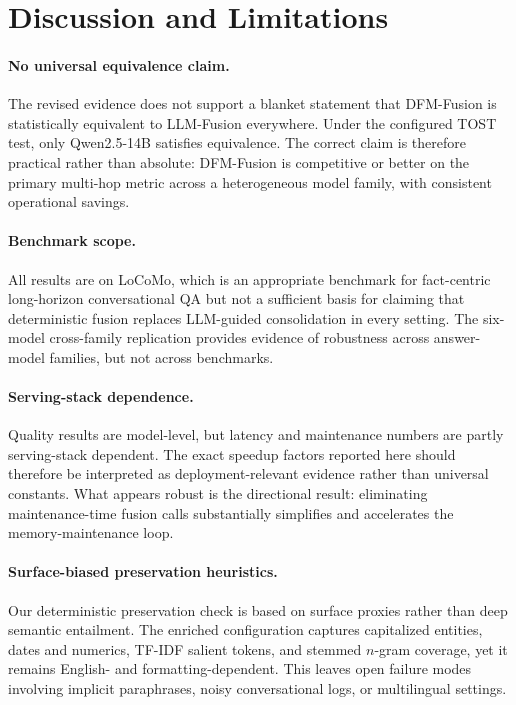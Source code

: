 \section{Discussion and Limitations}
\label{sec:discussion}

\paragraph{No universal equivalence claim.}
The revised evidence does not support a blanket statement that DFM-Fusion is statistically equivalent to LLM-Fusion everywhere. Under the configured TOST test, only Qwen2.5-14B satisfies equivalence. The correct claim is therefore practical rather than absolute: DFM-Fusion is competitive or better on the primary multi-hop metric across a heterogeneous model family, with consistent operational savings.

\paragraph{Benchmark scope.}
All results are on LoCoMo, which is an appropriate benchmark for fact-centric long-horizon conversational QA but not a sufficient basis for claiming that deterministic fusion replaces LLM-guided consolidation in every setting. The six-model cross-family replication provides evidence of robustness across answer-model families, but not across benchmarks.

\paragraph{Serving-stack dependence.}
Quality results are model-level, but latency and maintenance numbers are partly serving-stack dependent. The exact speedup factors reported here should therefore be interpreted as deployment-relevant evidence rather than universal constants. What appears robust is the directional result: eliminating maintenance-time fusion calls substantially simplifies and accelerates the memory-maintenance loop.

\paragraph{Surface-biased preservation heuristics.}
Our deterministic preservation check is based on surface proxies rather than deep semantic entailment. The enriched configuration captures capitalized entities, dates and numerics, TF-IDF salient tokens, and stemmed $n$-gram coverage, yet it remains English- and formatting-dependent. This leaves open failure modes involving implicit paraphrases, noisy conversational logs, or multilingual settings.

